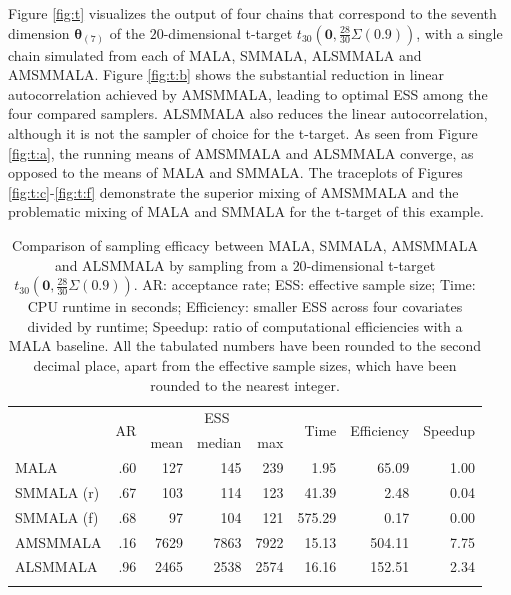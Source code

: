\documentclass[twoside,11pt]{article}
\begin{document}
Figure \ref{fig:t} visualizes the output of four chains that correspond to the seventh dimension $\boldsymbol{\theta}_{(7)}$
of the $20$-dimensional t-target $t_{30}(\mathbf{0},\frac{28}{30}\Sigma(0.9))$, with a single chain simulated from each of 
MALA, SMMALA, ALSMMALA and AMSMMALA. Figure \ref{fig:t:b} shows the substantial reduction in linear autocorrelation achieved 
by AMSMMALA, leading to optimal ESS among the four compared samplers. ALSMMALA also reduces the linear autocorrelation, 
although it is not the sampler of choice for the t-target. As seen from Figure \ref{fig:t:a}, the running means of AMSMMALA 
and ALSMMALA converge, as opposed to the means of MALA and SMMALA. The traceplots of Figures \ref{fig:t:c}-\ref{fig:t:f} 
demonstrate the superior mixing of AMSMMALA and the problematic mixing of MALA and SMMALA for the t-target of this example.

\begin{table}
	\begin{tabular}{l|r|rrr|r|r|r}
		\hline\noalign{\smallskip}
		\multirow{2}{*}{Method} &
		\multirow{2}{*}{AR} &
		\multicolumn{3}{c|}{ESS} &
		\multirow{2}{*}{Time} &
		\multirow{2}{*}{Efficiency} &
		\multirow{2}{*}{Speedup} \\
		& & mean & median & max & & & \\
		\noalign{\smallskip}\hline\noalign{\smallskip}
		MALA & .60 & 127 & 145 & 239 & 1.95 & 65.09 & 1.00 \\
		SMMALA (r) & .67 & 103 & 114 & 123 & 41.39 & 2.48 & 0.04 \\
		SMMALA (f) & .68 & 97 & 104 & 121 & 575.29 & 0.17 & 0.00 \\
		AMSMMALA & .16 & 7629 & 7863 & 7922 & 15.13 & 504.11 & 7.75 \\
		ALSMMALA & .96 & 2465 & 2538 & 2574 & 16.16 & 152.51 & 2.34 \\	
		\noalign{\smallskip}\hline
	\end{tabular}
	\caption{Comparison of sampling efficacy between MALA, SMMALA, AMSMMALA and ALSMMALA by sampling from a $20$-dimensional
		t-target $t_{30}(\mathbf{0},\frac{28}{30}\Sigma(0.9))$. AR: acceptance rate; ESS: effective sample size; Time: CPU 
		runtime in seconds; Efficiency: smaller ESS across four covariates divided by runtime; Speedup: ratio of computational 
		efficiencies with a MALA baseline. All the tabulated numbers have been rounded to the second decimal place, apart from 
		the effective sample sizes, which have been rounded to the nearest integer.}
	\label{tab:t}
\end{table}
\end{document}
